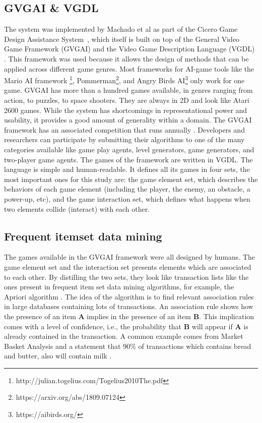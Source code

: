 \documentclass[letterpaper]{article} %
\begin{document}
\subsection{GVGAI \& VGDL}
The system was implemented by Machado et al as part of the Cicero Game Design Assistance System~\cite{Machado2018AIAssistedGD}, which itself is built on top of the General Video Game Framework (GVGAI) \cite{perez20162014} and the Video Game Description Language (VGDL) \cite{schaul2013video,ebner2013towards}.
This framework was used because it allows the design of methods that can be applied across different game genres. Most frameworks for AI-game tools like the Mario AI framework \footnote{http://julian.togelius.com/Togelius2010The.pdf}, Pommerman\footnote{https://arxiv.org/abs/1809.07124}, and Angry Birds AI\footnote{https://aibirds.org/} only work for one game. GVGAI has more than a hundred games available, in genres ranging from action, to puzzles, to space shooters. They are always in 2D and look like Atari 2600 games. While the system has shortcomings in representational power and usability, it provides a good amount of generality within a domain.
The GVGAI framework has an associated competition that runs annually \cite{perez20162014}. Developers and researchers can participate by submitting their algorithms to one of the many categories available like game play agents, level generators, game generators, and two-player game agents.
The games of the framework are written in VGDL. The language is simple and human-readable. It defines all its games in four sets, the most important ones for this study are:
the game element set, which describes the behaviors of each game element (including the player, the enemy, an obstacle, a power-up, etc),
and the game interaction set, which defines what happens when two elements collide (interact) with each other.

\subsection{Frequent itemset data mining}
The games available in the GVGAI framework were all designed by humans. The game element set and the interaction set presents elements which are associated to each other. By distilling the two sets, they look like transaction lists like the ones present in frequent item set data mining algorithms, for example, the Apriori algorithm \cite{guo2017application}. The idea of the algorithm is to find relevant association rules in large databases containing lots of transactions. An association rule shows how the presence of an item \textbf{A} implies in the presence of an item \textbf{B}. This implication comes with a level of confidence, i.e., the probability that \textbf{B} will appear if \textbf{A} is already contained in the transaction. A common example comes from Market Basket Analysis \cite{brin1997dynamic} and a statement that 90\% of transactions which contains bread and butter, also will contain milk \cite{agrawal1993mining}.
\end{document}
